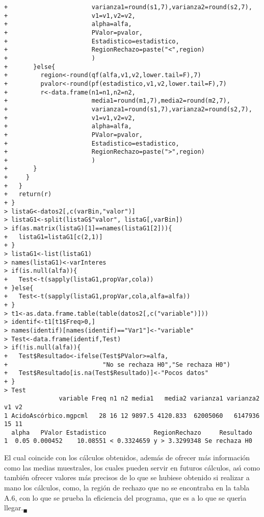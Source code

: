 \begin{solucion}
\begin{verbatim}
+                       varianza1=round(s1,7),varianza2=round(s2,7),
+                       v1=v1,v2=v2,
+                       alpha=alfa,
+                       PValor=pvalor,
+                       Estadistico=estadistico,
+                       RegionRechazo=paste("<",region)
+                       )
+       }else{
+         region<-round(qf(alfa,v1,v2,lower.tail=F),7)
+         pvalor<-round(pf(estadistico,v1,v2,lower.tail=F),7)
+         r<-data.frame(n1=n1,n2=n2,
+                       media1=round(m1,7),media2=round(m2,7),
+                       varianza1=round(s1,7),varianza2=round(s2,7),
+                       v1=v1,v2=v2,
+                       alpha=alfa,
+                       PValor=pvalor,
+                       Estadistico=estadistico,
+                       RegionRechazo=paste(">",region)
+                       )
+       }
+     }
+   }
+   return(r)
+ }
> listaG<-datos2[,c(varBin,"valor")]
> listaG1<-split(listaG$"valor", listaG[,varBin])
> if(as.matrix(listaG)[1]==names(listaG1[2])){
+   listaG1=listaG1[c(2,1)]
+ }
> listaG1<-list(listaG1)
> names(listaG1)<-varInteres
> if(is.null(alfa)){
+   Test<-t(sapply(listaG1,propVar,cola))
+ }else{
+   Test<-t(sapply(listaG1,propVar,cola,alfa=alfa))
+ }
> t1<-as.data.frame.table(table(datos2[,c("variable")]))
> identif<-t1[t1$Freq>0,]
> names(identif)[names(identif)=="Var1"]<-"variable"
> Test<-data.frame(identif,Test)
> if(!is.null(alfa)){
+   Test$Resultado<-ifelse(Test$PValor>=alfa,
+                          "No se rechaza H0","Se rechaza H0")
+   Test$Resultado[is.na(Test$Resultado)]<-"Pocos datos"
+ }
> Test
               variable Freq n1 n2 media1   media2 varianza1 varianza2 v1 v2
1 AcidoAscórbico.mgpcml   28 16 12 9897.5 4120.833  62005060   6147936 15 11
  alpha   PValor Estadistico             RegionRechazo     Resultado
1  0.05 0.000452    10.08551 < 0.3324659 y > 3.3299348 Se rechaza H0
 \end{verbatim}
 \vspace{-0.5cm}
 El cual coincide con los c\'alculos obtenidos,
 adem\'as de ofrecer m\'as informaci\'on como las medias muestrales,
 los cuales pueden servir en futuros c\'alculos,
 as\'{\i} como tambi\'en ofrecer valores m\'as precisos
 de lo que se hubiese obtenido si realizar a mano los c\'alculos,
 como, la regi\'on de rechazo que no se encontraba en la tabla A.6,
 con lo que se prueba la eficiencia del programa,
 que es a lo que se quer\'{\i}a llegar.${}_{\blacksquare}$
\end{solucion}
